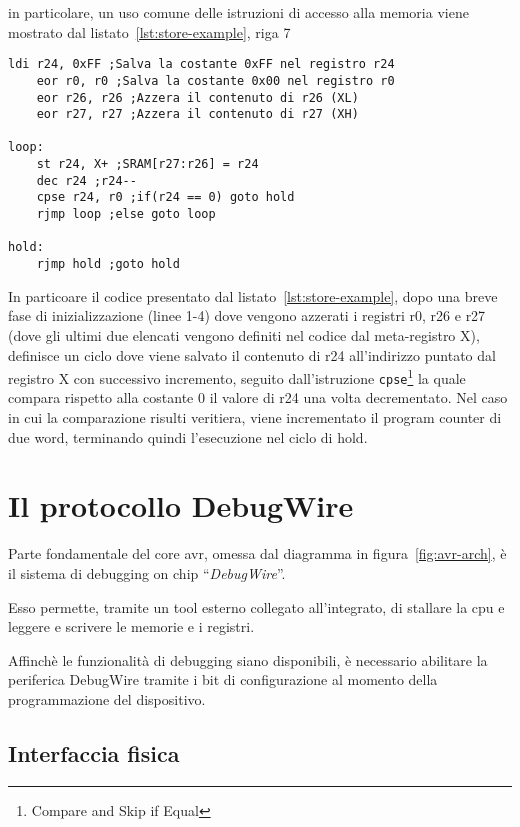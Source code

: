 in particolare, un uso comune delle istruzioni di accesso alla memoria viene mostrato dal listato~\ref{lst:store-example}, riga 7

\begin{lstlisting}[language=AVR, caption={Esempio}, label=lst:store-example]
    ldi r24, 0xFF ;Salva la costante 0xFF nel registro r24
    eor r0, r0 ;Salva la costante 0x00 nel registro r0
    eor r26, r26 ;Azzera il contenuto di r26 (XL)
    eor r27, r27 ;Azzera il contenuto di r27 (XH)

loop:
    st r24, X+ ;SRAM[r27:r26] = r24
    dec r24 ;r24--
    cpse r24, r0 ;if(r24 == 0) goto hold
    rjmp loop ;else goto loop

hold:
    rjmp hold ;goto hold
\end{lstlisting}

In particoare il codice presentato dal listato~\ref{lst:store-example}, dopo una breve fase di inizializzazione (linee 1-4) dove vengono azzerati i registri r0, r26 e r27 (dove gli ultimi due elencati vengono definiti nel codice dal meta-registro X), definisce un ciclo dove viene salvato il contenuto di r24 all'indirizzo puntato dal registro X con successivo incremento, seguito dall'istruzione \texttt{cpse}\footnote{Compare and Skip if Equal} la quale compara rispetto alla costante 0 il valore di r24 una volta decrementato. Nel caso in cui la comparazione risulti veritiera, viene incrementato il program counter di due word, terminando quindi l'esecuzione nel ciclo di hold.

\section{Il protocollo DebugWire}

Parte fondamentale del core avr, omessa dal diagramma in figura~\ref{fig:avr-arch}, è il sistema di debugging on chip ``\textit{DebugWire}''.

Esso permette, tramite un tool esterno collegato all'integrato, di stallare la cpu e leggere e scrivere le memorie e i registri.\cite{avr:m328p}

Affinchè le funzionalità di debugging siano disponibili, è necessario abilitare la periferica DebugWire tramite i bit di configurazione al momento della programmazione del dispositivo.

\subsection{Interfaccia fisica}

